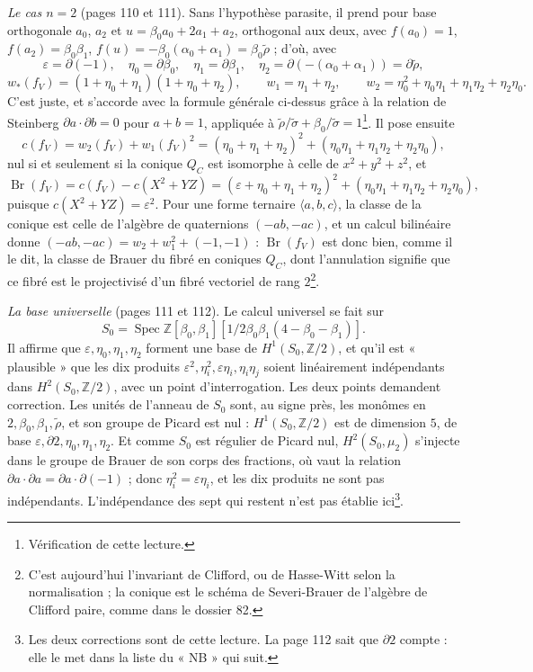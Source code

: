 \documentclass[11pt,a4paper]{article}
\begin{document}
\emph{Le cas $n = 2$} (pages 110 et 111). Sans l'hypothèse parasite, il prend
pour base orthogonale $a_0$, $a_2$ et $u = \beta_0 a_0 + 2a_1 + a_2$, orthogonal
aux deux, avec $f(a_0) = 1$, $f(a_2) = \beta_0\beta_1$, $f(u) = -\beta_0(\alpha_0 +
\alpha_1) = \beta_0\tilde\rho$ ; d'où, avec
\[
\varepsilon = \partial(-1), \quad \eta_0 = \partial\beta_0, \quad \eta_1 =
\partial\beta_1, \quad \eta_2 = \partial(-(\alpha_0 + \alpha_1)) = \partial\tilde\rho ,
\]
\[
w_*(f_V) = (1 + \eta_0 + \eta_1)(1 + \eta_0 + \eta_2), \qquad w_1 = \eta_1 +
\eta_2, \qquad w_2 = \eta_0^2 + \eta_0\eta_1 + \eta_1\eta_2 + \eta_2\eta_0 .
\]
C'est juste, et s'accorde avec la formule générale ci-dessus grâce à la
relation de Steinberg $\partial a \cdot \partial b = 0$ pour $a + b = 1$,
appliquée à $\tilde\rho/\tilde\sigma + \beta_0/\tilde\sigma = 1$\footnote{Vérification de cette lecture.}. Il pose ensuite
\[
c(f_V) = w_2(f_V) + w_1(f_V)^2 = (\eta_0 + \eta_1 + \eta_2)^2 + (\eta_0\eta_1 +
\eta_1\eta_2 + \eta_2\eta_0),
\]
nul si et seulement si la conique $Q_C$ est isomorphe à celle de $x^2 + y^2 +
z^2$, et
\[
\operatorname{Br}(f_V) = c(f_V) - c(X^2 + YZ) = (\varepsilon + \eta_0 + \eta_1 +
\eta_2)^2 + (\eta_0\eta_1 + \eta_1\eta_2 + \eta_2\eta_0),
\]
puisque $c(X^2 + YZ) = \varepsilon^2$. Pour une forme ternaire $\langle a, b, c
\rangle$, la classe de la conique est celle de l'algèbre de quaternions $(-ab,
-ac)$, et un calcul bilinéaire donne $(-ab, -ac) = w_2 + w_1^2 + (-1, -1)$ :
$\operatorname{Br}(f_V)$ est donc bien, comme il le dit, la classe de Brauer du
fibré en coniques $Q_C$, dont l'annulation signifie que ce fibré est le
projectivisé d'un fibré vectoriel de rang $2$\footnote{C'est aujourd'hui
l'invariant de Clifford, ou de Hasse-Witt selon la normalisation ; la conique
est le schéma de Severi-Brauer de l'algèbre de Clifford paire, comme dans le
dossier 82.}.

\emph{La base universelle} (pages 111 et 112). Le calcul universel se fait sur
\[
S_0 = \operatorname{Spec} \mathbb{Z}[\beta_0, \beta_1][1/2\beta_0\beta_1(4 -
\beta_0 - \beta_1)].
\]
Il affirme que $\varepsilon, \eta_0, \eta_1, \eta_2$ forment
une base de $H^1(S_0, \mathbb{Z}/2)$, et qu'il est « plausible » que les dix
produits $\varepsilon^2, \eta_i^2, \varepsilon\eta_i, \eta_i\eta_j$ soient
linéairement indépendants dans $H^2(S_0, \mathbb{Z}/2)$, avec un point
d'interrogation. Les deux points demandent correction. Les unités de l'anneau
de $S_0$ sont, au signe près, les monômes en $2, \beta_0, \beta_1, \tilde\rho$, et
son groupe de Picard est nul : $H^1(S_0, \mathbb{Z}/2)$ est de dimension $5$, de
base $\varepsilon, \partial 2, \eta_0, \eta_1, \eta_2$. Et comme $S_0$ est
régulier de Picard nul, $H^2(S_0, \mu_2)$ s'injecte dans le groupe de Brauer de
son corps des fractions, où vaut la relation $\partial a \cdot \partial a =
\partial a \cdot \partial(-1)$ ; donc $\eta_i^2 = \varepsilon\eta_i$, et les dix
produits ne sont pas indépendants. L'indépendance des sept qui restent n'est pas
établie ici\footnote{Les deux corrections sont de cette lecture. La page 112 sait
que $\partial 2$ compte : elle le met dans la liste du « NB » qui suit.}.
\end{document}
